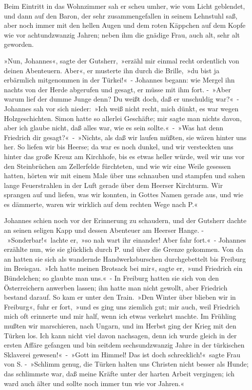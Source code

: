 Beim Eintritt in das Wohnzimmer sah er scheu umher, wie vom Licht geblendet, und dann auf den Baron, der sehr zusammengefallen in seinem Lehnstuhl saß, aber noch immer mit den hellen Augen und dem roten Käppchen auf dem Kopfe wie vor achtundzwanzig Jahren; neben ihm die gnädige Frau, auch alt, sehr alt geworden.

»Nun, Johannes«, sagte der Gutsherr, »erzähl mir einmal recht ordentlich von deinen Abenteuern. Aber«, er musterte ihn durch die Brille, »du bist ja erbärmlich mitgenommen in der Türkei!« - Johannes begann: wie Mergel ihn nachts von der Herde abgerufen und gesagt, er müsse mit ihm fort. - »Aber warum lief der dumme Junge denn? Du weißt doch, daß er unschuldig war?« - Johannes sah vor sich nieder: »Ich weiß nicht recht, mich dünkt, es war wegen Holzgeschichten. Simon hatte so allerlei Geschäfte; mir sagte man nichts davon, aber ich glaube nicht, daß alles war, wie es sein sollte.« - »Was hat denn Friedrich dir gesagt?« - »Nichts, als daß wir laufen müßten, sie wären hinter uns her. So liefen wir bis Heerse; da war es noch dunkel, und wir versteckten uns hinter das große Kreuz am Kirchhofe, bis es etwas heller würde, weil wir uns vor den Steinbrüchen am Zellerfelde fürchteten, und wie wir eine Weile gesessen hatten, hörten wir mit einem Male über uns schnauben und stampfen und sahen lange Feuerstrahlen in der Luft gerade über dem Heerser Kirchturm. Wir sprangen auf und liefen, was wir konnten, in Gottes Namen gerade aus, und wie es dämmerte, waren wir wirklich auf dem rechten Wege nach P.«

Johannes schien noch vor der Erinnerung zu schaudern, und der Gutsherr dachte an seinen seligen Kapp und dessen Abenteuer am Heerser Hange. - »Sonderbar!« lachte er, »so nah wart ihr einander! Aber fahr fort.« - Johannes erzählte nun, wie sie glücklich durch P. und über die Grenze gekommen. Von da an hatten sie sich als wandernde Handwerksburschen durchgebettelt bis Freiburg im Breisgau. »Ich hatte meinen Brotsack bei mir«, sagte er, »und Friedrich ein Bündelchen; so glaubte man uns.« - In Freiburg hatten sie sich von den Österreichern anwerben lassen; ihn hatte man nicht gewollt, aber Friedrich bestand darauf. So kam er unter den Train. »Den Winter über blieben wir in Freiburg«, fuhr er fort, »und es ging uns ziemlich gut; mir auch, weil Friedrich mich oft erinnerte und mir half, wenn ich etwas verkehrt machte. Im Frühling mußten wir marschieren, nach Ungarn, und im Herbst ging der Krieg mit den Türken los. Ich kann nicht viel davon nachsagen, denn ich wurde gleich in der ersten Affäre gefangen und bin seitdem sechsundzwanzig Jahre in der türkischen Sklaverei gewesen!« - »Gott im Himmel! Das ist doch schrecklich!« sagte Frau von S. - »Schlimm genug, die Türken halten uns Christen nicht besser als Hunde; das schlimmste war, daß meine Kräfte unter der harten Arbeit vergingen; ich ward auch älter und sollte noch immer tun wie vor Jahren.«

